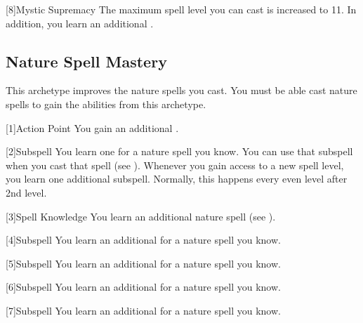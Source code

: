         [8]{Mystic Supremacy}
        The maximum spell level you can cast is increased to 11.
        In addition, you learn an additional .

    \subsection{Nature Spell Mastery}
        This archetype improves the nature spells you cast.
        You must be able cast nature spells to gain the abilities from this archetype.

        [1]{Action Point}
        You gain an additional .

        [2]{Subspell}
        You learn one  for a nature spell you know.
        You can use that subspell when you cast that spell (see ).
        Whenever you gain access to a new spell level, you learn one additional subspell.
        Normally, this happens every even level after 2nd level.

        [3]{Spell Knowledge}
        You learn an additional nature spell (see ).

        [4]{Subspell}
        You learn an additional  for a nature spell you know.

        [5]{Subspell}
        You learn an additional  for a nature spell you know.

        [6]{Subspell}
        You learn an additional  for a nature spell you know.

        [7]{Subspell}
        You learn an additional  for a nature spell you know.

